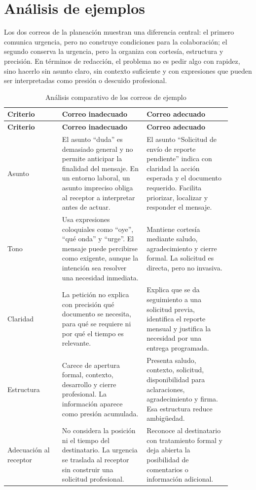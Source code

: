 \documentclass[
	spanish,
	letterpaper, oneside
]{article}
\begin{document}
\section{Análisis de ejemplos}

Los dos correos de la planeación muestran una diferencia central: el primero comunica urgencia, pero no construye condiciones para la colaboración; el segundo conserva la urgencia, pero la organiza con cortesía, estructura y precisión. En términos de redacción, el problema no es pedir algo con rapidez, sino hacerlo sin asunto claro, sin contexto suficiente y con expresiones que pueden ser interpretadas como presión o descuido profesional.

\begin{longtable}{@{}p{0.22\linewidth}p{0.34\linewidth}p{0.34\linewidth}@{}}
\caption{Análisis comparativo de los correos de ejemplo}\label{tab:analisis-correos}\\
\toprule
\textbf{Criterio} & \textbf{Correo inadecuado} & \textbf{Correo adecuado} \\
\midrule
\endfirsthead
\toprule
\textbf{Criterio} & \textbf{Correo inadecuado} & \textbf{Correo adecuado} \\
\midrule
\endhead
Asunto & El asunto ``duda'' es demasiado general y no permite anticipar la finalidad del mensaje. En un entorno laboral, un asunto impreciso obliga al receptor a interpretar antes de actuar. & El asunto ``Solicitud de envío de reporte pendiente'' indica con claridad la acción esperada y el documento requerido. Facilita priorizar, localizar y responder el mensaje. \\
\addlinespace
Tono & Usa expresiones coloquiales como ``oye'', ``qué onda'' y ``urge''. El mensaje puede percibirse como exigente, aunque la intención sea resolver una necesidad inmediata. & Mantiene cortesía mediante saludo, agradecimiento y cierre formal. La solicitud es directa, pero no invasiva. \\
\addlinespace
Claridad & La petición no explica con precisión qué documento se necesita, para qué se requiere ni por qué el tiempo es relevante. & Explica que se da seguimiento a una solicitud previa, identifica el reporte mensual y justifica la necesidad por una entrega programada. \\
\addlinespace
Estructura & Carece de apertura formal, contexto, desarrollo y cierre profesional. La información aparece como presión acumulada. & Presenta saludo, contexto, solicitud, disponibilidad para aclaraciones, agradecimiento y firma. Esa estructura reduce ambigüedad. \\
\addlinespace
Adecuación al receptor & No considera la posición ni el tiempo del destinatario. La urgencia se traslada al receptor sin construir una solicitud profesional. & Reconoce al destinatario con tratamiento formal y deja abierta la posibilidad de comentarios o información adicional. \\
\bottomrule
\end{longtable}
\end{document}
